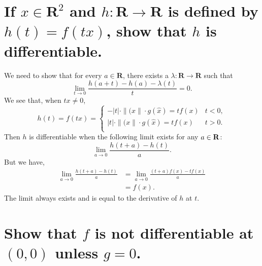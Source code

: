 \begin{parts}
    \part{
        If $x\in \mathbf{R}^2$ and
        $h:\mathbf{R}\to\mathbf{R}
        $ is defined by $h(t)=f(tx)$, show that $h$ is
        differentiable.
    }

    \begin{solution}
        We need to show that for every $a\in \mathbf{R}$,
        there
        exists a $\lambda:\mathbf{R}\to\mathbf{R}$
        such that
        \begin{equation}
            \lim_{t\to 0}
            {\frac{h(a+t)-h(a)-\lambda(t)}{t}} = 0.
        \end{equation}
        We see that, when $tx\neq 0$,
        $$h(t)=f(tx)=
        \begin{cases}
            -\vert t\vert\cdot\|(x\|\cdot 
            g\left(\hat{x}\right) = tf(x) & t<0,\\
            \vert t\vert\cdot\|(x\|\cdot 
            g\left(\hat{x}\right) = tf(x) & t>0.\\
        \end{cases}$$
        Then $h$ is differentiable when the following
        limit exists for any $a\in \mathbf{R}$:
        $$\lim_{a \to 0 }{\frac{h(t+a)-h(t)}{a}}.$$
        But we have,
        \begin{align*}
            \lim_{a\to 0}{\frac{h(t+a)-h(t)}{a}}
            &=\lim_{a\to 0}{\frac{(t+a)f(x)-tf(x)}{a}}\\
            &= f(x).
        \end{align*}
        The limit always exists and is equal to the
        derivative of $h$ at $t$.
    \end{solution}

    \part{
        Show that $f$ is not differentiable at $(0,0)$
        unless $g=0$.
    }
    \begin{solution}
        
    \end{solution}
\end{parts}